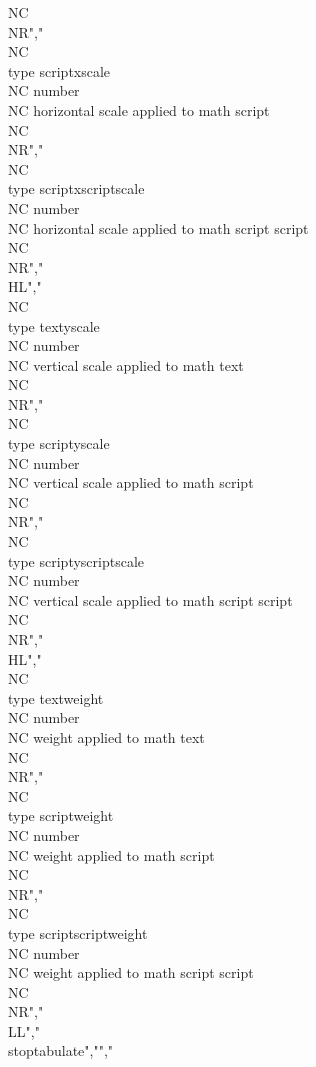 NC \\NR","\\NC \\type {scriptxscale}       \\NC number  \\NC horizontal scale applied to math script        \\NC \\NR","\\NC \\type {scriptxscriptscale} \\NC number  \\NC horizontal scale applied to math script script \\NC \\NR","\\HL","\\NC \\type {textyscale}         \\NC number  \\NC vertical scale applied to math text          \\NC \\NR","\\NC \\type {scriptyscale}       \\NC number  \\NC vertical scale applied to math script        \\NC \\NR","\\NC \\type {scriptyscriptscale} \\NC number  \\NC vertical scale applied to math script script \\NC \\NR","\\HL","\\NC \\type {textweight}         \\NC number  \\NC weight  applied to math text          \\NC \\NR","\\NC \\type {scriptweight}       \\NC number  \\NC weight  applied to math script        \\NC \\NR","\\NC \\type {scriptscriptweight} \\NC number  \\NC weight  applied to math script script \\NC \\NR","\\LL","\\stoptabulate","","%